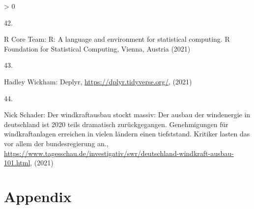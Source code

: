 \documentclass[a4paper,11pt]{article}
\newlength{\cslhangindent}
\newlength{\csllabelwidth}
\newenvironment{CSLReferences}[3] %
 {%
  \setlength{\parindent}{0pt}
  \ifodd #1 \everypar{\setlength{\hangindent}{\cslhangindent}}\ignorespaces\fi
  \ifnum #2 > 0
  \setlength{\parskip}{#2\baselineskip}
  \fi
 }%
 {}
\newcommand{\CSLLeftMargin}[1]{\parbox[t]{\maxof{\widthof{#1}}{\csllabelwidth}}{#1}}
\newcommand{\CSLRightInline}[1]{\parbox[t]{\linewidth}{#1}}
\begin{document}
\begin{CSLReferences}{0}{0}
\leavevmode\hypertarget{ref-R}{}%
\CSLLeftMargin{42. }
\CSLRightInline{R Core Team: R: A language and environment for statistical computing. R Foundation for Statistical Computing, Vienna, Austria (2021)}

\leavevmode\hypertarget{ref-HadleyWickham.2021}{}%
\CSLLeftMargin{43. }
\CSLRightInline{Hadley Wickham: Deplyr, \url{https://dplyr.tidyverse.org/}, (2021)}

\leavevmode\hypertarget{ref-NickSchader.2021}{}%
\CSLLeftMargin{44. }
\CSLRightInline{Nick Schader: Der windkraftausbau stockt massiv: Der ausbau der windenergie in deutschland ist 2020 teils dramatisch zur{ü}ckgegangen. Genehmigungen f{ü}r windkraftanlagen erreichen in vielen l{ä}ndern einen tiefststand. Kritiker lasten das vor allem der bundesregierung an., \url{https://www.tagesschau.de/investigativ/swr/deutschland-windkraft-ausbau-101.html}, (2021)}

\end{CSLReferences}
\indent
\setlength{\parindent}{17pt}
\setlength{\leftskip}{0pt}
\setlength{\parskip}{0pt}

\newpage

\appendix

\hypertarget{appendix}{%
\section{Appendix}\label{appendix}}
\end{document}
